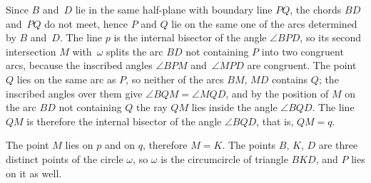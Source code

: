 {    Since $B$ and~$D$ lie in the same half-plane with boundary line $PQ$, the chords $BD$ and~$PQ$ do not meet, hence $P$ and $Q$ lie on the same one of the arcs determined by $B$ and~$D$. The line $p$ is the internal bisector of the angle $\angle BPD$, so its second intersection $M$ with~$\omega$ splits the arc $BD$ not containing $P$ into two congruent arcs, because the inscribed angles $\angle BPM$ and~$\angle MPD$ are congruent. The point $Q$ lies on the same arc as $P$, so neither of the arcs $BM$, $MD$ contains $Q$; the inscribed angles over them give $\angle BQM = \angle MQD$, and by the position of $M$ on the arc $BD$ not containing $Q$ the ray $QM$ lies inside the angle $\angle BQD$. The line $QM$ is therefore the internal bisector of the angle $\angle BQD$, that is, $QM = q$.

    The point $M$ lies on $p$ and on $q$, therefore $M = K$. The points $B$, $K$, $D$ are three distinct points of the circle $\omega$, so $\omega$ is the circumcircle of triangle $BKD$, and $P$ lies on it as well.
}

